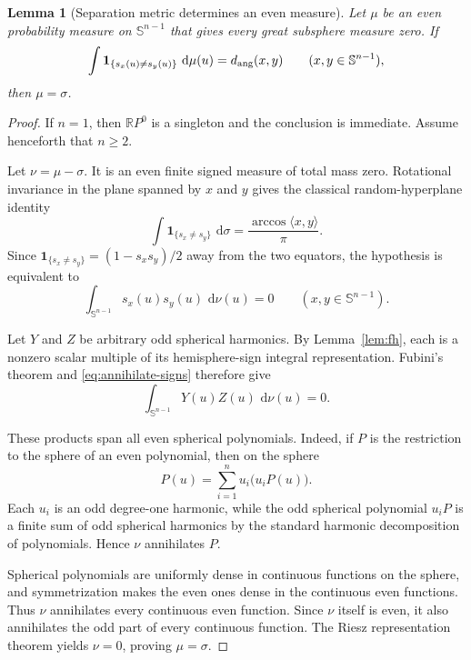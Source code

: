 \documentclass[11pt]{article}
\newtheorem{lemma}[theorem]{Lemma}
\newcommand{\Sph}{\mathbb S}
\newcommand{\R}{\mathbb R}
\newcommand{\dd}{\,\mathrm d}
\begin{document}
\begin{lemma}[Separation metric determines an even measure]
\label{lem:inject}
Let $\mu$ be an even probability measure on $\Sph^{n-1}$ that gives every
great subsphere measure zero.  If
\[
 \int \mathbf1_{\{s_x(u)\neq s_y(u)\}}\,\dd\mu(u)
 =d_{\rm ang}(x,y)
 \qquad(x,y\in\Sph^{n-1}),
\]
then $\mu=\sigma$.
\end{lemma}

\begin{proof}
If $n=1$, then $\R P^0$ is a singleton and the conclusion is immediate.
Assume henceforth that $n\geq2$.

Let $\nu=\mu-\sigma$.  It is an even finite signed measure of total mass zero.
Rotational invariance in the plane spanned by $x$ and $y$ gives the classical
random-hyperplane identity
\[
 \int\mathbf1_{\{s_x\neq s_y\}}\,\dd\sigma
 =\frac{\arccos\langle x,y\rangle}{\pi}.
\]
Since $\mathbf1_{\{s_x\neq s_y\}}=(1-s_xs_y)/2$ away from the two equators,
the hypothesis is equivalent to
\begin{equation}\label{eq:annihilate-signs}
  \int_{\Sph^{n-1}}s_x(u)s_y(u)\,\dd\nu(u)=0
  \qquad(x,y\in\Sph^{n-1}).
\end{equation}

Let $Y$ and $Z$ be arbitrary odd spherical harmonics.  By
Lemma~\ref{lem:fh}, each is a nonzero scalar multiple of its hemisphere-sign
integral representation.  Fubini's theorem and
\eqref{eq:annihilate-signs} therefore give
\[
 \int_{\Sph^{n-1}}Y(u)Z(u)\,\dd\nu(u)=0.
\]

These products span all even spherical polynomials.  Indeed, if $P$ is the
restriction to the sphere of an even polynomial, then on the sphere
\[
 P(u)=\sum_{i=1}^n u_i\bigl(u_iP(u)\bigr).
\]
Each $u_i$ is an odd degree-one harmonic, while the odd spherical polynomial
$u_iP$ is a finite sum of odd spherical harmonics by the standard harmonic
decomposition of polynomials.  Hence $\nu$ annihilates $P$.

Spherical polynomials are uniformly dense in continuous functions on the
sphere, and symmetrization makes the even ones dense in the continuous even
functions.  Thus $\nu$ annihilates every continuous even function.  Since
$\nu$ itself is even, it also annihilates the odd part of every continuous
function.  The Riesz representation theorem yields $\nu=0$, proving
$\mu=\sigma$.
\end{proof}
\end{document}
